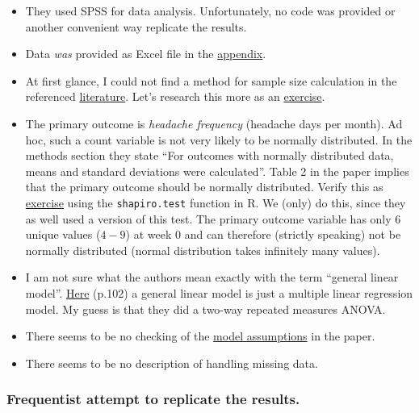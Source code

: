 \documentclass[
]{book}
\begin{document}
\begin{itemize}
\item
  They used SPSS for data analysis. Unfortunately,
  no code was provided or another convenient way replicate the
  results.
\item
  Data \emph{was} provided as Excel file in the
  \href{https://www.sciencedirect.com/science/article/pii/S1836955324000572?via\%3Dihub\#appsec1}{appendix}.
\item
  At first glance, I could not find a method for sample size calculation
  in the referenced \href{https://journals.sagepub.com/doi/epub/10.1177/0333102417738202}{literature}.
  Let's research this more as an \hyperref[exercise8_LMM]{exercise}.
\item
  The primary outcome is \emph{headache frequency}
  (headache days per month). Ad hoc, such a count variable is not very likely
  to be normally distributed. In the methods section they state ``For outcomes with
  normally distributed data, means and standard deviations were calculated''.
  Table 2 in the paper implies that the primary outcome should be normally distributed.
  Verify this as \hyperref[exercise9_LMM]{exercise} using the \texttt{shapiro.test} function in R.
  We (only) do this, since they as well used a version of this test.
  The primary outcome variable has only \(6\) unique values (\(4-9\)) at week \(0\)
  and can therefore (strictly speaking) not be normally distributed
  (normal distribution takes infinitely many values).
\item
  I am not sure what the authors mean exactly with the term ``general linear model''.
  \href{https://books.google.at/books?hl=en&lr=&id=G_qdEsDlkp0C&oi=fnd&pg=PA101&dq=\%22general+linear+model\%22&ots=Xo0OAwX2UL&sig=TRvLmI4G9oti296S5wjmiWjfWVY&redir_esc=y\#v=onepage&q=\%22general\%20linear\%20model\%22&f=false}{Here}
  (p.102) a general linear model is just a multiple linear regression model.
  My guess is that they did a two-way repeated measures ANOVA.
\item
  There seems to be no checking of the
  \href{https://statistics.laerd.com/spss-tutorials/two-way-repeated-measures-anova-using-spss-statistics.php}{model assumptions}
  in the paper.
\item
  There seems to be no description of handling missing data.
\end{itemize}

\subsubsection{Frequentist attempt to replicate the results.}\label{frequentist-attempt-to-replicate-the-results.}
\end{document}
